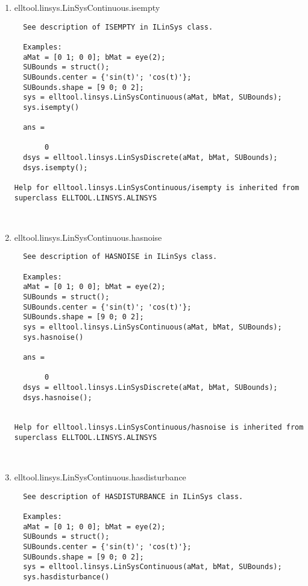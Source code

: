 \begin{enumerate}
\begin{lstlisting}
\end{lstlisting}
\fontfamily{\familydefault}
\selectfont
\item {elltool.linsys.LinSysContinuous.isempty}
\selectfont
\begin{lstlisting}
  See description of ISEMPTY in ILinSys class.

  Examples:
  aMat = [0 1; 0 0]; bMat = eye(2);
  SUBounds = struct();
  SUBounds.center = {'sin(t)'; 'cos(t)'};
  SUBounds.shape = [9 0; 0 2];
  sys = elltool.linsys.LinSysContinuous(aMat, bMat, SUBounds);
  sys.isempty()

  ans =

       0
  dsys = elltool.linsys.LinSysDiscrete(aMat, bMat, SUBounds);
  dsys.isempty();

Help for elltool.linsys.LinSysContinuous/isempty is inherited from superclass ELLTOOL.LINSYS.ALINSYS



\end{lstlisting}
\fontfamily{\familydefault}
\selectfont
\item {elltool.linsys.LinSysContinuous.hasnoise}
\selectfont
\begin{lstlisting}
  See description of HASNOISE in ILinSys class.

  Examples:
  aMat = [0 1; 0 0]; bMat = eye(2);
  SUBounds = struct();
  SUBounds.center = {'sin(t)'; 'cos(t)'};
  SUBounds.shape = [9 0; 0 2];
  sys = elltool.linsys.LinSysContinuous(aMat, bMat, SUBounds);
  sys.hasnoise()

  ans =

       0
  dsys = elltool.linsys.LinSysDiscrete(aMat, bMat, SUBounds);
  dsys.hasnoise();


Help for elltool.linsys.LinSysContinuous/hasnoise is inherited from superclass ELLTOOL.LINSYS.ALINSYS



\end{lstlisting}
\fontfamily{\familydefault}
\selectfont
\item {elltool.linsys.LinSysContinuous.hasdisturbance}
\selectfont
\begin{lstlisting}
  See description of HASDISTURBANCE in ILinSys class.

  Examples:
  aMat = [0 1; 0 0]; bMat = eye(2);
  SUBounds = struct();
  SUBounds.center = {'sin(t)'; 'cos(t)'};
  SUBounds.shape = [9 0; 0 2];
  sys = elltool.linsys.LinSysContinuous(aMat, bMat, SUBounds);
  sys.hasdisturbance()


\end{lstlisting}
\end{enumerate}
